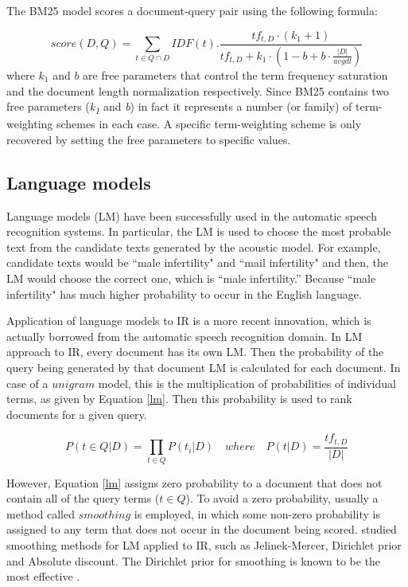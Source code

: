 The BM25 model scores a document-query pair using the following formula:

\begin{equation}\label{bm25}
score(D, Q)=\sum_{t \in Q \cap D} IDF(t) . \frac{tf_{t,D}\cdot(k_1+1)}{tf_{t,D}+k_1\cdot(1-b+b\cdot \frac{|D|}{avgdl})}
\end{equation}
where $k_1$ and $b$ are free parameters that control the term frequency saturation and the document length normalization respectively.
Since BM25 contains two free parameters (\emph{k\textsubscript{1}} and \emph{b}) in fact it represents a number (or family) of term-weighting schemes in each case. 
A specific term-weighting scheme is only recovered by setting the free parameters to specific values. 

\subsection{Language models}

Language models (LM) have been successfully used in the automatic speech recognition systems.
In particular, the LM is used to choose the most probable text from the candidate texts generated by the acoustic model.
For example, candidate texts would be ``male infertility" and ``mail infertility" and then, the LM would choose the correct one, which is ``male infertility.''
Because ``male infertility" has much higher probability to occur in the English language.

Application of language models to IR \citep{Ponte98,hiemstraPhD,lm} is a more recent innovation, which is actually borrowed from the automatic speech recognition domain.
In LM approach to IR, every document has its own LM. Then the probability of the query being generated by that document LM is calculated for each document.
In case of a $unigram$ model, this is the multiplication of probabilities of individual terms, as given by Equation \ref{lm}.
Then this probability is used to rank documents for a given query.

\begin{equation}\label{lm}
P(t \in Q \vert D) = \prod_{t \in Q} P(t_i \vert D) \quad where \quad P(t \vert D) = \frac{tf_{t,D}}{|D|}
\end{equation}

However, Equation \ref{lm} assigns zero probability to a document that does not contain all of the query terms ($t \in Q$).
To avoid a zero probability, usually a method called $smoothing$ is employed, in which some non-zero probability is assigned to any term that does not occur in the document being scored.
\citet{jelinek} studied smoothing methods for LM applied to IR, such as Jelinek-Mercer, Dirichlet prior and Absolute discount.
The Dirichlet prior for smoothing is known to be the most effective \citep{irPractice}.

